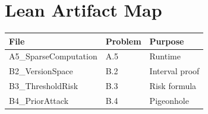 \documentclass[11pt]{article}
\begin{document}
\appendix

\section{Lean Artifact Map}

\begin{center}
\begin{tabular}{lll}
\toprule
File & Problem & Purpose \\
\midrule
A5\_SparseComputation & A.5 & Runtime \\
B2\_VersionSpace & B.2 & Interval proof \\
B3\_ThresholdRisk & B.3 & Risk formula \\
B4\_PriorAttack & B.4 & Pigeonhole \\
\bottomrule
\end{tabular}
\end{center}
\end{document}
